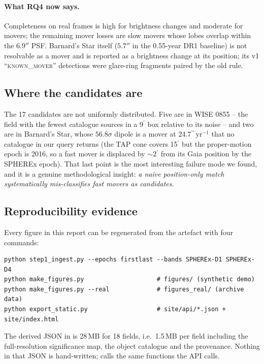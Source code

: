 \documentclass[11pt,a4paper]{article}
\newcommand{\arcmin}{\ensuremath{{}^{\prime}}}
\newcommand{\arcsec}{\ensuremath{{}^{\prime\prime}}}
\newcommand{\code}[1]{\texttt{\small\detokenize{#1}}}
\begin{document}
\paragraph{What RQ4 now says.} Completeness on real frames is high for brightness changes and
moderate for movers; the remaining mover losses are slow movers whose lobes overlap within the
$6.9''$ PSF. Barnard's Star itself ($5.7''$ in the 0.55-year DR1 baseline) is not resolvable as a
mover and is reported as a brightness change at its position; its v1 ``\textsc{known\_mover}''
detections were glare-ring fragments paired by the old rule.

\subsection{Where the candidates are}

The 17 candidates are not uniformly distributed. Five are in WISE 0855 -- the field with the fewest
catalogue sources in a 9\arcmin{} box relative to its noise -- and two are in Barnard's Star, whose
$56.8\sigma$ dipole is a mover at $24.7\arcsec$\,yr$^{-1}$ that no catalogue in our query returns (the
TAP cone covers 15\arcmin{} but the proper-motion epoch is 2016, so a fast mover is displaced by
$\sim$$2\arcmin$ from its Gaia position by the SPHEREx epoch). That last point is the most interesting
failure mode we found, and it is a genuine methodological insight: \emph{a naive position-only match
systematically mis-classifies fast movers as candidates}.

\subsection{Reproducibility evidence}

Every figure in this report can be regenerated from the artefact with four commands:

\begin{lstlisting}[style=sh]
python step1_ingest.py --epochs firstlast --bands SPHEREx-D1 SPHEREx-D4
python make_figures.py                    # figures/ (synthetic demo)
python make_figures.py --real             # figures_real/ (archive data)
python export_static.py                   # site/api/*.json + site/index.html
\end{lstlisting}

The derived JSON in \code{site/api/} is 28\,MB for 18 fields, i.e.\ 1.5\,MB per field including the
full-resolution significance map, the object catalogue and the provenance. Nothing in that JSON is
hand-written; \code{export\_static.py} calls the same functions the API calls.
\end{document}
